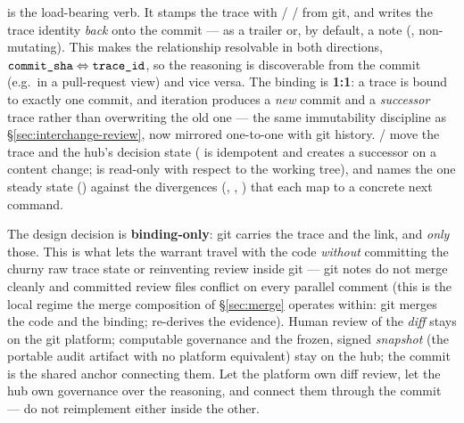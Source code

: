  is the load-bearing verb. It stamps the trace with  /  /
 from git, and writes the trace identity \emph{back} onto the commit --- as a
 trailer or, by default, a  note (, non-mutating). This makes
the relationship resolvable in both directions, $\code{commit\_sha} \Leftrightarrow \code{trace\_id}$, so the
reasoning is discoverable from the commit (e.g.\ in a pull-request view) and vice versa. The binding is
\textbf{1:1}: a trace is bound to exactly one commit, and iteration produces a \emph{new} commit and a
\emph{successor} trace rather than overwriting the old one --- the same immutability discipline as
\S\ref{sec:interchange-review}, now mirrored one-to-one with git history.  /  move the
trace and the hub's decision state ( is idempotent and creates a successor on a content change;
 is read-only with respect to the working tree), and  names the one steady state
() against the divergences (, , ) that each map to a concrete
next command.

The design decision is \textbf{binding-only}: git carries the trace and the link, and \emph{only} those. This
is what lets the warrant travel with the code \emph{without} committing the churny raw trace state or
reinventing review inside git --- git notes do not merge cleanly and committed review files conflict on every
parallel comment (this is the local regime the merge composition of \S\ref{sec:merge} operates within: git
merges the code and the binding;  re-derives the evidence). Human review of the \emph{diff} stays
on the git platform; computable governance and the frozen, signed \emph{snapshot} (the portable audit artifact
with no platform equivalent) stay on the hub; the commit is the shared anchor connecting them. Let the
platform own diff review, let the hub own governance over the reasoning, and connect them through the commit
--- do not reimplement either inside the other.

